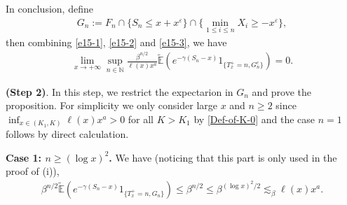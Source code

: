 \documentclass[10pt,a4paper]{amsart}
\numberwithin{equation}{section}
\begin{document}
In conclusion,  define
\begin{align}
	G_n:= F_n\cap \{S_n\leq x+x^\varepsilon\} \cap \Big\{\min_{1\leq i\leq n} X_i \geq -x^{\varepsilon} \Big\},
\end{align} 
then combining \eqref{e15-1}, \eqref{e15-2} and \eqref{e15-3}, we have 
\begin{align}\label{e15}
	\lim_{x\to+\infty} \sup_{n\in \mathbb{N}}\frac{ \beta^{n/2} }{\ell(x) x^a} \widetilde{\mathbb{E}}\left(e^{-\gamma (S_n-x)}1_{\{T_x^+=n, G_n^c\}}\right) =0. 
\end{align}

\noindent
{\bf(Step 2)}. In this step, we  restrict the expectarion in $G_n$ and prove the proposition. 
 For simplicity we only consider large $x$ and  $n\geq 2$ since   $\inf_{x\in (K_1, K)}\ell(x)x^a >0$ for all $K>K_1$ by \eqref{Def-of-K-0} and the case $n=1$ follows by direct calculation. 
 
 \noindent
 {\bf Case 1: $n  \geq (\log x)^2$.}  We have (noticing that this part is only used in the proof of (i)),
\begin{align}\label{e17}
	 \beta^{n/2} \widetilde{\mathbb{E}}\left(e^{-\gamma (S_n-x)}1_{\{T_x^+=n, G_n\}}\right) \leq  \beta^{n/2}\leq  \beta^{(\log x)^2/2}\lesssim_\beta   \ell(x)x^a.
\end{align}
\end{document}
